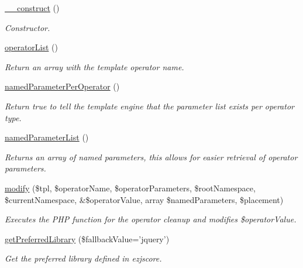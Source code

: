 \begin{DoxyCompactItemize}
\item 
\hyperlink{classextension_1_1ezextrafeatures_1_1autoloads_1_1e_z_j_s_features_template_operators_a5d53ed750f68b7a1894466eef7c15959}{\-\_\-\-\_\-construct} ()
\begin{DoxyCompactList}\small\item\em Constructor. \end{DoxyCompactList}\item 
\hyperlink{classextension_1_1ezextrafeatures_1_1autoloads_1_1e_z_j_s_features_template_operators_a5fb25519ae0ba3cfb2ff3277585cc75e}{operator\-List} ()
\begin{DoxyCompactList}\small\item\em Return an array with the template operator name. \end{DoxyCompactList}\item 
\hyperlink{classextension_1_1ezextrafeatures_1_1autoloads_1_1e_z_j_s_features_template_operators_a52de337c8c4e4a53c2aaaee706ea5799}{named\-Parameter\-Per\-Operator} ()
\begin{DoxyCompactList}\small\item\em Return true to tell the template engine that the parameter list exists per operator type. \end{DoxyCompactList}\item 
\hyperlink{classextension_1_1ezextrafeatures_1_1autoloads_1_1e_z_j_s_features_template_operators_aea0c427bbf99cdb80c382b692566e9e9}{named\-Parameter\-List} ()
\begin{DoxyCompactList}\small\item\em Returns an array of named parameters, this allows for easier retrieval of operator parameters. \end{DoxyCompactList}\item 
\hyperlink{classextension_1_1ezextrafeatures_1_1autoloads_1_1e_z_j_s_features_template_operators_a4f8acb7c985b9a6352df0bd7498e33f0}{modify} (\$tpl, \$operator\-Name, \$operator\-Parameters, \$root\-Namespace, \$current\-Namespace, \&\$operator\-Value, array \$named\-Parameters, \$placement)
\begin{DoxyCompactList}\small\item\em Executes the P\-H\-P function for the operator cleanup and modifies {\itshape \$operator\-Value\/}. \end{DoxyCompactList}\item 
\hyperlink{classextension_1_1ezextrafeatures_1_1autoloads_1_1e_z_j_s_features_template_operators_aa9eab9cb61178d63e988a00b566f8c49}{get\-Preferred\-Library} (\$fallback\-Value='jquery')
\begin{DoxyCompactList}\small\item\em Get the preferred library defined in ezjscore. \end{DoxyCompactList}\end{DoxyCompactItemize}
